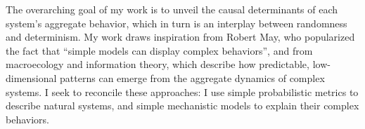 \documentclass[12pt]{article}
\begin{document}
The overarching goal of my work is to unveil the causal 
determinants of each system's aggregate behavior, which in
turn is an interplay between randomness and determinism.
My work draws inspiration from Robert May, who popularized  
the fact that ``simple models can display complex behaviors'', 
and from macroecology and information theory, which describe how 
predictable, low-dimensional patterns can emerge from the 
aggregate dynamics of complex systems.  I seek to reconcile
these approaches: I use simple probabilistic metrics to 
describe natural systems, and simple mechanistic 
models to explain their complex behaviors.



\section{}

%
%
\end{document}

